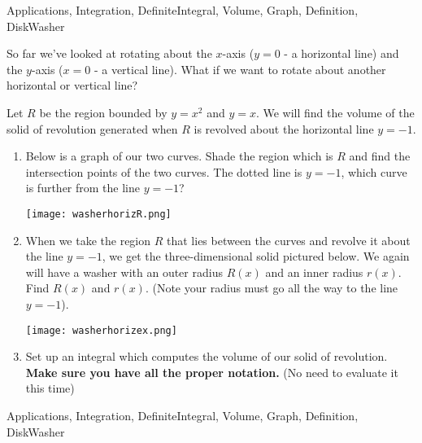 \begin{tagblock}{Applications, Integration, DefiniteIntegral, Volume, Graph, Definition, DiskWasher}
\begin{question}
	


So far we've looked at rotating about the $x$-axis ($y=0$ - a horizontal line) and the $y$-axis ($x=0$ - a vertical line).  What if we want to rotate about another horizontal or vertical line?


\bigskip



Let   $R$ be the region bounded by $y=x^2$ and $y=x$.  We will find the volume of the  solid of revolution generated when $R$ is revolved about the horizontal line $y=-1$.
\begin{enumerate}
\item  Below is a graph of our two curves.  Shade the region which is $R$ and find the intersection points of the two curves.  The dotted line is $y=-1$, which curve is further from the line $y=-1$?

\texttt{[image: washerhorizR.png]}

\item  When we take the region $R$ that lies between the curves and revolve it about the line $y=-1$, we get the three-dimensional solid pictured below.  We again will have a washer with an outer radius $R(x)$ and an inner radius $r(x)$.  Find $R(x)$ and $r(x)$.  (Note your radius must go all the way to the line $y=-1$).

\texttt{[image: washerhorizex.png]}
\item Set up an integral which  computes the volume of our  solid of revolution.   \textbf{Make sure you have all the proper notation.} (No need to evaluate it this time)


\end{enumerate}



    
\begin{tags}
       Applications, Integration, DefiniteIntegral, Volume, Graph, Definition, DiskWasher
\end{tags}
    
\begin{diary}
\end{diary}
	
\begin{solution}

\end{solution}
	
\end{question}

\end{tagblock}

